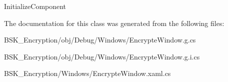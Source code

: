 Initialize\+Component 



The documentation for this class was generated from the following files\+:\begin{DoxyCompactItemize}
\item 
B\+S\+K\+\_\+\+Encryption/obj/\+Debug/\+Windows/Encrypte\+Window.\+g.\+cs\item 
B\+S\+K\+\_\+\+Encryption/obj/\+Debug/\+Windows/Encrypte\+Window.\+g.\+i.\+cs\item 
B\+S\+K\+\_\+\+Encryption/\+Windows/Encrypte\+Window.\+xaml.\+cs\end{DoxyCompactItemize}
